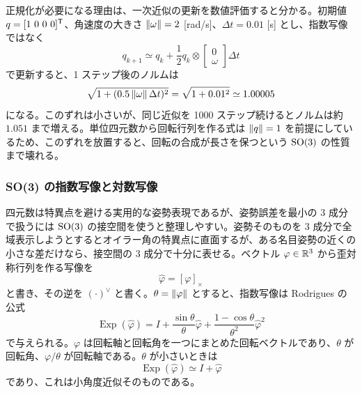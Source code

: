 正規化が必要になる理由は、一次近似の更新を数値評価すると分かる。初期値 $q=[1\ 0\ 0\ 0]^{\mathsf{T}}$、角速度の大きさ $\left\|\omega\right\|=2$ [rad/s]、$\Delta t=0.01$ [s] とし、指数写像ではなく
\begin{equation}
  q_{k+1}\simeq q_k+\frac{1}{2}q_k\otimes
  \begin{bmatrix}
    0\\ \omega
  \end{bmatrix}\Delta t
\end{equation}
で更新すると、1 ステップ後のノルムは
\begin{equation}
  \sqrt{1+(0.5\left\|\omega\right\|\Delta t)^2}
  =
  \sqrt{1+0.01^2}
  \simeq 1.00005
\end{equation}
になる。このずれは小さいが、同じ近似を 1000 ステップ続けるとノルムは約 $1.051$ まで増える。単位四元数から回転行列を作る式は $\left\|q\right\|=1$ を前提にしているため、このずれを放置すると、回転の合成が長さを保つという $\operatorname{SO}(3)$ の性質まで壊れる。

\subsubsection{SO(3) の指数写像と対数写像}

四元数は特異点を避ける実用的な姿勢表現であるが、姿勢誤差を最小の 3 成分で扱うには $\operatorname{SO}(3)$ の接空間を使うと整理しやすい。姿勢そのものを 3 成分で全域表示しようとするとオイラー角の特異点に直面するが、ある名目姿勢の近くの小さな差だけなら、接空間の 3 成分で十分に表せる。ベクトル $\varphi\in\mathbb{R}^3$ から歪対称行列を作る写像を
\begin{equation}
  \widehat{\varphi}=[\varphi]_\times
\end{equation}
と書き、その逆を $(\cdot)^\vee$ と書く。$\theta=\left\|\varphi\right\|$ とすると、指数写像は Rodrigues の公式
\begin{equation}
  \operatorname{Exp}(\widehat{\varphi})
  =
  I
  +\frac{\sin\theta}{\theta}\widehat{\varphi}
  +\frac{1-\cos\theta}{\theta^2}\widehat{\varphi}^2
\end{equation}
で与えられる。$\varphi$ は回転軸と回転角を一つにまとめた回転ベクトルであり、$\theta$ が回転角、$\varphi/\theta$ が回転軸である。$\theta$ が小さいときは
\begin{equation}
  \operatorname{Exp}(\widehat{\varphi})
  \simeq I+\widehat{\varphi}
\end{equation}
であり、これは小角度近似そのものである。

